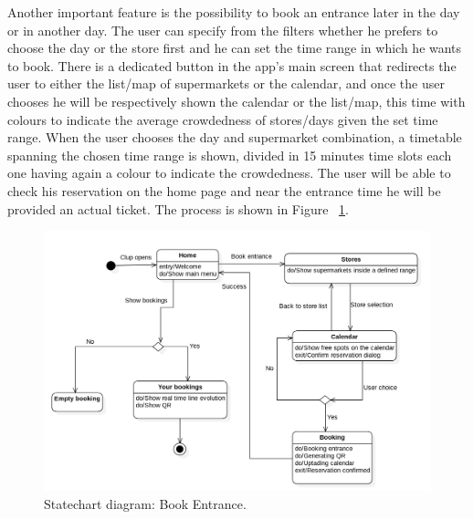 Another important feature is the possibility to book an entrance later in the day or in another day. The user can specify from the filters whether he prefers to choose the day or the store first and he can set the time range in which he wants to book. 
There is a dedicated button in the app’s main screen that redirects the user to either the list/map of supermarkets or the calendar, and once the user chooses he will be respectively shown the calendar or the list/map, this time with colours to indicate the average crowdedness of stores/days given the set time range.
When the user chooses the day and supermarket combination, a timetable spanning the chosen time range is shown, divided in 15 minutes time slots each one having again a colour to indicate the crowdedness. The user will be able to check his reservation on the home page and near the entrance time he will be provided an actual ticket. The process is shown in Figure ~\ref{fig:BookEntr}.\\

\begin{figure}
	\includegraphics[width=\linewidth]{../Diagrams/BookEntrance.png}
	\caption{Statechart diagram: Book Entrance.}
	\label{fig:BookEntr}
\end{figure} 

